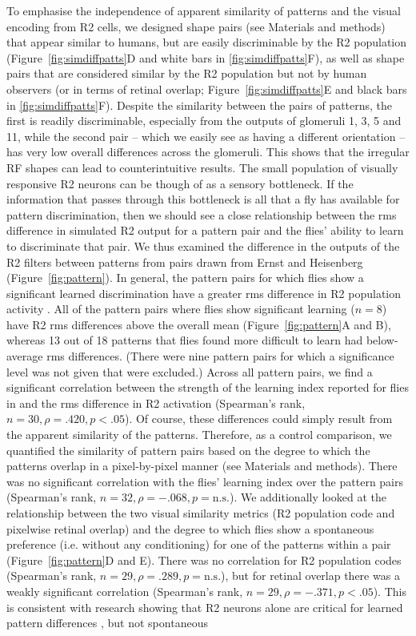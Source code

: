To emphasise the independence of apparent similarity of patterns and the visual encoding from R2 cells, we designed shape pairs (see Materials and methods) that appear similar to humans, but are easily discriminable by the R2 population (Figure~\ref{fig:simdiffpatts}D and white bars in \ref{fig:simdiffpatts}F), as well as shape pairs that are considered similar by the R2 population but not by human observers (or in terms of retinal overlap; Figure~\ref{fig:simdiffpatts}E and black bars in \ref{fig:simdiffpatts}F). Despite the similarity between the pairs of patterns, the first is readily discriminable, especially from the outputs of glomeruli 1, 3, 5 and 11, while the second pair – which we easily see as having a different orientation – has very low overall differences across the glomeruli. This shows that the irregular \ac{RF} shapes can lead to counterintuitive results. The small population of visually responsive R2 neurons can be though of as a sensory bottleneck. If the information that passes through this bottleneck is all that a fly has available for pattern discrimination, then we should see a close relationship between the \ac{rms} difference in simulated R2 output for a pattern pair and the flies’ ability to learn to discriminate that pair. We thus examined the difference in the outputs of the R2 filters between patterns from pairs drawn from Ernst and Heisenberg \cite{Ernst1999} (Figure~\ref{fig:pattern}). In general, the pattern pairs for which flies show a significant learned discrimination have a greater \ac{rms} difference in R2 population activity \cite{Ernst1999}. All of the pattern pairs where flies show significant learning ($n = 8$) have R2 \ac{rms} differences above the overall mean (Figure~\ref{fig:pattern}A and B), whereas 13 out of 18 patterns that flies found more difficult to learn had below-average \ac{rms} differences. (There were nine pattern pairs for which a significance level was not given that were excluded.) Across all pattern pairs, we find a significant correlation between the strength of the learning index reported for flies in \cite{Ernst1999} and the \ac{rms} difference in R2 activation (Spearman’s rank, $n = 30, \rho = .420, p < .05$). Of course, these differences could simply result from the apparent similarity of the patterns. Therefore, as a control comparison, we quantified the similarity of pattern pairs based on the degree to which the patterns overlap in a pixel-by-pixel manner (see Materials and methods). There was no significant correlation with the flies’ learning index over the pattern pairs (Spearman’s rank, $n = 32, \rho = -.068, p = \mathrm{n.s.}$). We additionally looked at the relationship between the two visual similarity metrics (R2 population code and pixelwise retinal overlap) and the degree to which flies show a spontaneous preference (i.e. without any conditioning) for one of the patterns within a pair (Figure~\ref{fig:pattern}D and E). There was no correlation for R2 population codes (Spearman's rank, $n = 29, \rho = .289, p = \mathrm{n.s.}$), but for retinal overlap there was a weakly significant correlation (Spearman's rank, $n = 29, \rho = -.371, p < .05$). This is consistent with research showing that R2 neurons alone are critical for learned pattern differences \cite{Ernst1999}, but not spontaneous 